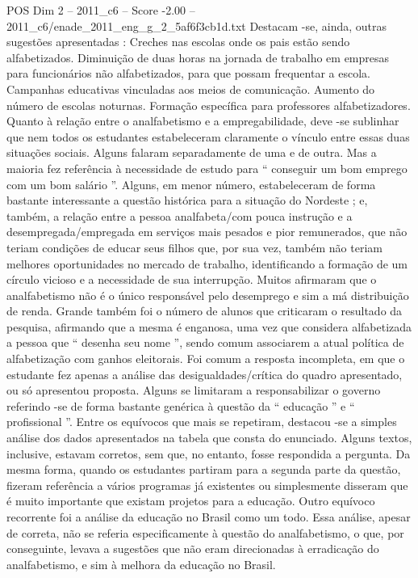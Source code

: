 \begin{textsample}{POS Dim 2 – 2011\_c6 – Score -2.00 – 2011\_c6/enade\_2011\_eng\_g\_2\_5af6f3cb1d.txt}
Destacam -se, ainda, outras sugestões apresentadas : Creches nas escolas onde os pais estão sendo alfabetizados.
Diminuição de duas horas na jornada de trabalho em empresas para funcionários não alfabetizados, para que possam frequentar a escola.
Campanhas educativas vinculadas aos meios de comunicação.
Aumento do número de escolas noturnas.
Formação específica para professores alfabetizadores.
Quanto à relação entre o analfabetismo e a empregabilidade, deve -se sublinhar que nem todos os estudantes estabeleceram claramente o vínculo entre essas duas situações sociais.
Alguns falaram separadamente de uma e de outra.
Mas a maioria fez referência à necessidade de estudo para “ conseguir um bom emprego com um bom salário ”.
Alguns, em menor número, estabeleceram de forma bastante interessante a questão histórica para a situação do Nordeste ; e, também, a relação entre a pessoa analfabeta/com pouca instrução e a desempregada/empregada em serviços mais pesados e pior remunerados, que não teriam condições de educar seus filhos que, por sua vez, também não teriam melhores oportunidades no mercado de trabalho, identificando a formação de um círculo vicioso e a necessidade de sua interrupção.
Muitos afirmaram que o analfabetismo não é o único responsável pelo desemprego e sim a má distribuição de renda.
Grande também foi o número de alunos que criticaram o resultado da pesquisa, afirmando que a mesma é enganosa, uma vez que considera alfabetizada a pessoa que “ desenha seu nome ”, sendo comum associarem a atual política de alfabetização com ganhos eleitorais.
Foi comum a resposta incompleta, em que o estudante fez apenas a análise das desigualdades/crítica do quadro apresentado, ou só apresentou proposta.
Alguns se limitaram a responsabilizar o governo referindo -se de forma bastante genérica à questão da “ educação ” e “ profissional ”.
Entre os equívocos que mais se repetiram, destacou -se a simples análise dos dados apresentados na tabela que consta do enunciado.
Alguns textos, inclusive, estavam corretos, sem que, no entanto, fosse respondida a pergunta.
Da mesma forma, quando os estudantes partiram para a segunda parte da questão, fizeram referência a vários programas já existentes ou simplesmente disseram que é muito importante que existam projetos para a educação.
Outro equívoco recorrente foi a análise da educação no Brasil como um todo.
Essa análise, apesar de correta, não se referia especificamente à questão do analfabetismo, o que, por conseguinte, levava a sugestões que não eram direcionadas à erradicação do analfabetismo, e sim à melhora da educação no Brasil.

\end{textsample}
